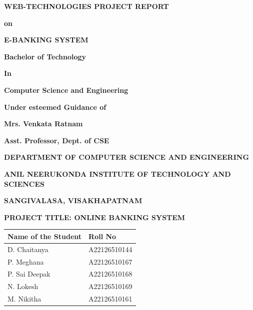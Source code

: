 \documentclass[12pt,a4paper]{report}
\begin{document}
\begin{titlepage}
    \centering
    \vspace*{1cm}
    {\huge\bfseries WEB-TECHNOLOGIES PROJECT REPORT\par}
    \vspace{1cm}
    {\Large\bfseries on\par}
    \vspace{1cm}
    {\huge\bfseries E-BANKING SYSTEM\par}
    \vspace{2cm}
    {\Large\bfseries Bachelor of Technology\par}
    \vspace{0.5cm}
    {\Large\bfseries In\par}
    \vspace{0.5cm}
    {\Large\bfseries Computer Science and Engineering\par}
    \vspace{2cm}
    {\Large\bfseries Under esteemed Guidance of\par}
    \vspace{0.5cm}
    {\Large\bfseries Mrs. Venkata Ratnam\par}
    \vspace{0.5cm}
    {\Large\bfseries Asst. Professor, Dept. of CSE\par}
    \vspace{2cm}
    {\Large\bfseries DEPARTMENT OF COMPUTER SCIENCE AND ENGINEERING\par}
    \vspace{0.5cm}
    {\Large\bfseries ANIL NEERUKONDA INSTITUTE OF TECHNOLOGY AND SCIENCES\par}
    \vspace{0.5cm}
    {\Large\bfseries SANGIVALASA, VISAKHAPATNAM\par}
\end{titlepage}

\thispagestyle{empty}
\begin{center}
    \LARGE\textbf{PROJECT TITLE: ONLINE BANKING SYSTEM}\\
    \vspace{2cm}

    \begin{tabular}{|l|l|}
        \hline
        \textbf{Name of the Student} & \textbf{Roll No} \\
        \hline
        D. Chaitanya & A22126510144 \\
        \hline
        P. Meghana & A22126510167 \\
        \hline
        P. Sai Deepak & A22126510168 \\
        \hline
        N. Lokesh & A22126510169 \\
        \hline
        M. Nikitha & A22126510161 \\
        \hline
    \end{tabular}
\end{center}
\newpage
\end{document}
